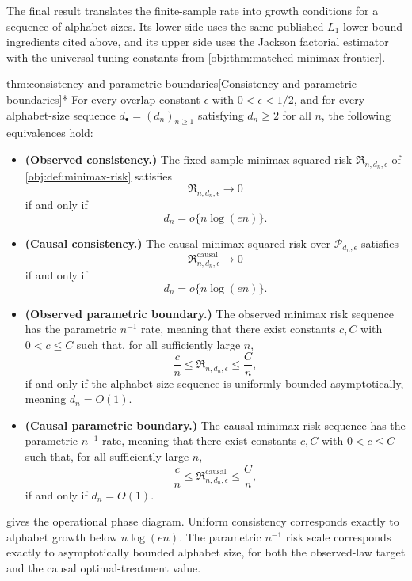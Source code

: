 The final result translates the finite-sample rate into growth conditions for a sequence of alphabet sizes. Its lower side uses the same published \(L_1\) lower-bound ingredients cited above, and its upper side uses the Jackson factorial estimator with the universal tuning constants from \cref{obj:thm:matched-minimax-frontier}.

\begin{theoremv}{thm:consistency-and-parametric-boundaries}[Consistency and parametric boundaries]*
For every overlap constant \(\epsilon\) with \(0<\epsilon<1/2\), and for every alphabet-size sequence \(d_\bullet=(d_n)_{n\ge 1}\) satisfying \(d_n\ge 2\) for all \(n\), the following equivalences hold:
\begin{itemize}
\item \textbf{(Observed consistency.)} The fixed-sample minimax squared risk \(\mathfrak R_{n,d_n,\epsilon}\) of \cref{obj:def:minimax-risk} satisfies
\[
\mathfrak R_{n,d_n,\epsilon}\longrightarrow 0
\]
if and only if
\[
d_n=o\{n\log(en)\}.
\]
\item \textbf{(Causal consistency.)} The causal minimax squared risk over \(\mathcal P_{d_n,\epsilon}\) satisfies
\[
\mathfrak R^{\mathrm{causal}}_{n,d_n,\epsilon}\longrightarrow 0
\]
if and only if
\[
d_n=o\{n\log(en)\}.
\]
\item \textbf{(Observed parametric boundary.)} The observed minimax risk sequence has the parametric \(n^{-1}\) rate, meaning that there exist constants \(c,C\) with \(0<c\le C\) such that, for all sufficiently large \(n\),
\[
\frac{c}{n}\le \mathfrak R_{n,d_n,\epsilon}\le \frac{C}{n},
\]
if and only if the alphabet-size sequence is uniformly bounded asymptotically, meaning \(d_n=O(1)\).
\item \textbf{(Causal parametric boundary.)} The causal minimax risk sequence has the parametric \(n^{-1}\) rate, meaning that there exist constants \(c,C\) with \(0<c\le C\) such that, for all sufficiently large \(n\),
\[
\frac{c}{n}\le \mathfrak R^{\mathrm{causal}}_{n,d_n,\epsilon}\le \frac{C}{n},
\]
if and only if \(d_n=O(1)\).
\end{itemize}
\end{theoremv}

 gives the operational phase diagram. Uniform consistency corresponds exactly to alphabet growth below \(n\log(en)\). The parametric \(n^{-1}\) risk scale corresponds exactly to asymptotically bounded alphabet size, for both the observed-law target and the causal optimal-treatment value.
